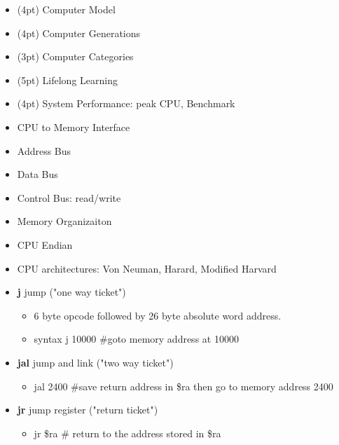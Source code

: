
\begin{itemize}
\item (4pt) Computer Model
\item (4pt) Computer Generations
\item (3pt) Computer Categories
\item (5pt) Lifelong Learning
\item (4pt) System Performance: peak CPU, Benchmark
\end{itemize}

\begin{itemize}
\item CPU to Memory Interface
\item Address Bus
\item Data Bus
\item Control Bus: read/write
\item Memory Organizaiton
\item CPU Endian
\item CPU architectures: Von Neuman, Harard, Modified Harvard
\end{itemize}

\begin{itemize}
\item \textbf{j} jump ("one way ticket")
    \begin{itemize}
        \item 6 byte opcode followed by 26 byte absolute word address.
        \item syntax j 10000 \#goto memory address at 10000
    \end{itemize}
\item \textbf{jal} jump and link ("two way ticket")
    \begin{itemize}
        \item jal 2400 \#save return address in \$ra then go to memory address 2400
    \end{itemize}
\item \textbf{jr} jump register ("return ticket")
    \begin{itemize}
        \item jr \$ra \# return to the address stored in \$ra
    \end{itemize}
\end{itemize}

